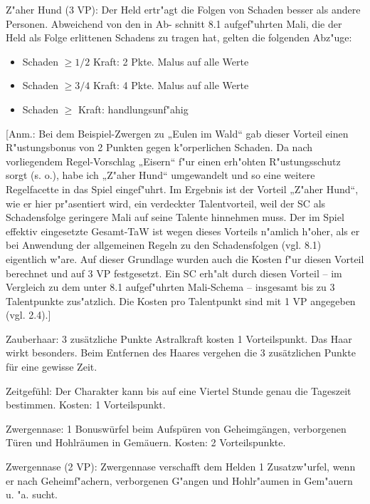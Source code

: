 \begin{description}
\item{Z"aher Hund (3 VP):}
Der Held ertr"agt die Folgen von Schaden besser als andere Personen. Abweichend von den in Ab- schnitt 8.1 aufgef"uhrten Mali, die der Held als Folge erlittenen Schadens zu tragen hat, gelten die folgenden Abz"uge:
\begin{itemize}
\item Schaden $\ge 1/2$ Kraft: 2 Pkte. Malus auf alle Werte
\item Schaden $\ge 3/4$ Kraft: 4 Pkte. Malus auf alle Werte
\item Schaden $\ge$ Kraft:    handlungsunf"ahig
\end{itemize}
[Anm.: Bei dem Beispiel-Zwergen zu „Eulen im Wald“ gab dieser Vorteil einen R"ustungsbonus von 2 Punkten gegen k"orperlichen Schaden. Da nach vorliegendem Regel-Vorschlag „Eisern“ f"ur einen erh"ohten R"ustungsschutz sorgt (s. o.), habe ich „Z"aher Hund“ umgewandelt und so eine weitere Regelfacette in das Spiel eingef"uhrt. Im Ergebnis ist der Vorteil „Z"aher Hund“, wie er hier pr"asentiert wird, ein verdeckter Talentvorteil, weil der SC als Schadensfolge geringere Mali auf seine Talente hinnehmen muss. Der im Spiel effektiv eingesetzte Gesamt-TaW ist wegen dieses Vorteils n"amlich h"oher, als er bei Anwendung der allgemeinen Regeln zu den Schadensfolgen (vgl. 8.1) eigentlich w"are. Auf dieser Grundlage wurden auch die Kosten f"ur diesen Vorteil berechnet und auf 3 VP festgesetzt. Ein SC erh"alt durch diesen Vorteil – im Vergleich zu dem unter 8.1 aufgef"uhrten Mali-Schema – insgesamt bis zu 3 Talentpunkte zus"atzlich. Die Kosten pro Talentpunkt sind mit 1 VP angegeben (vgl. 2.4).]

\item{Zauberhaar:} 3 zusätzliche Punkte Astralkraft kosten 1 Vorteilspunkt. Das Haar wirkt besonders. Beim Entfernen des Haares vergehen die 3 zusätzlichen Punkte für eine gewisse Zeit.

\item{Zeitgefühl:} Der Charakter kann bis auf eine Viertel Stunde genau die Tageszeit bestimmen. Kosten: 1 Vorteilspunkt.

\item{Zwergennase:} 1 Bonuswürfel beim Aufspüren von Geheimgängen, verborgenen Türen und Hohlräumen in Gemäuern. Kosten: 2 Vorteilspunkte.

\item{Zwergennase (2 VP):} Zwergennase verschafft dem Helden 1 Zusatzw"urfel, wenn er nach Geheimf"achern, verborgenen G"angen und Hohlr"aumen in Gem"auern u. "a. sucht.

\end{description}
\EN

